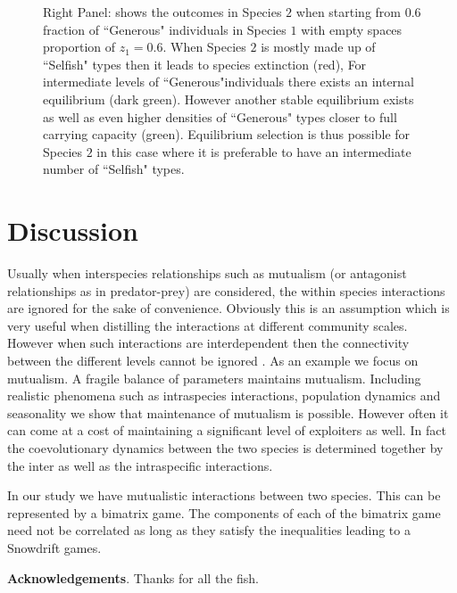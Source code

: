 \documentclass[12pt]{article}
\begin{document}
\begin{figure}
\begin{center}
{{Right Panel: shows the outcomes in Species $2$ when starting from $0.6$ fraction of ``Generous" individuals in Species $1$ with empty spaces proportion of $z_1 = 0.6$.
When Species $2$ is mostly made up of ``Selfish" types then it leads to species extinction (red), For intermediate levels of ``Generous"individuals there exists an internal equilibrium (dark green). However another stable equilibrium exists as well as even higher densities of ``Generous" types closer to full carrying capacity (green).
Equilibrium selection is thus possible for Species $2$ in this case where it is preferable to have an intermediate number of ``Selfish" types.
\label{fig:popdyn}
}
}
\end{center}
\end{figure}




\section{Discussion}

Usually when interspecies relationships such as mutualism (or antagonist relationships as in predator-prey) are considered, the within species interactions are ignored for the sake of convenience. 
Obviously this is an assumption which is very useful when distilling the interactions at different community scales.
However when such interactions are interdependent then the connectivity between the different levels cannot be ignored \cite{Schluter:2012hn}.
As an example we focus on mutualism.
A fragile balance of parameters maintains mutualism.
Including realistic phenomena such as intraspecies interactions, population dynamics and seasonality we show that maintenance of mutualism is possible.
However often it can come at a cost of maintaining a significant level of exploiters as well.
In fact the coevolutionary dynamics between the two species is determined together by the inter as well as the intraspecific interactions.

In our study we have mutualistic interactions between two species. This can be represented by a bimatrix game. The components of each of the bimatrix game need not be correlated as long as they satisfy the inequalities leading to a Snowdrift games.

\textbf{Acknowledgements}. Thanks for all the fish.



%


\end{document}
